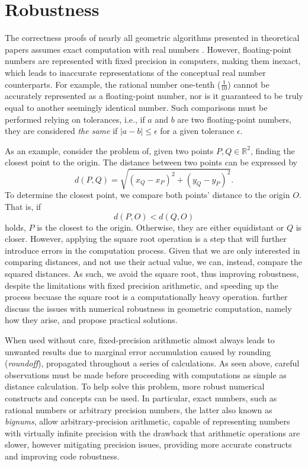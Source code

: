 \section{Robustness}
\label{sec:related.robustness}

The correctness proofs of nearly all geometric algorithms presented in
theoretical papers assumes exact computation with real numbers
\cite{cgal:bfghhkps-lgk23-18b}.  However, floating-point numbers are represented
with fixed precision in computers, making them inexact, which leads to
inaccurate representations of the conceptual real number counterparts.  For
example, the rational number one-tenth ($\frac{1}{10}$) cannot be accurately
represented as a floating-point number, nor is it guaranteed to be truly equal
to another seemingly identical number.  Such comparisons must be performed
relying on tolerances, i.e., if $a$ and $b$ are two floating-point numbers, they
are considered \textit{the same} if $|a - b| \le \epsilon$ for a given tolerance
$\epsilon$.

As an example, consider the problem of, given two points $P,Q \in \mathbb{R}^2$,
finding the closest point to the origin.  The distance between two points can be
expressed by
%
\begin{equation}
  d(P, Q) = \sqrt{(x_Q - x_P)^2 + (y_Q - y_P)^2}.
\end{equation}
%
To determine the closest point, we compare both points' distance to the origin
$O$.  That is, if
%
\[
  d(P, O) < d(Q, O)
\]
%
holds, $P$ is the closest to the origin.  Otherwise, they are either equidistant
or $Q$ is closer.  However, applying the square root operation is a step that
will further introduce errors in the computation process.  Given that we are
only interested in comparing distances, and not use their actual value, we can,
instead, compare the squared distances.  As such, we avoid the square root, thus
improving robustness, despite the limitations with fixed precision arithmetic,
and speeding up the process becuase the square root is a computationally heavy
operation.  \citet{Mei:2014:NRGC} further discuss the issues with numerical
robustness in geometric computation, namely how they arise, and propose
practical solutions.

When used without care, fixed-precision arithmetic almost always leads to
unwanted results due to marginal error accumulation caused by rounding
(\textit{roundoff}), propagated throughout a series of calculations.  As seen
above, careful observations must be made before proceeding with computations as
simple as distance calculation.  To help solve this problem, more robust
numerical constructs and concepts can be used.  In particular, exact numbers,
such as rational numbers or arbitrary precision numbers, the latter also known
as \textit{bignums}, allow arbitrary-precision arithmetic, capable of
representing numbers with virtually infinite precision with the drawback that
arithmetic operations are slower, however mitigating precision issues, providing
more accurate constructs and improving code robustness.

